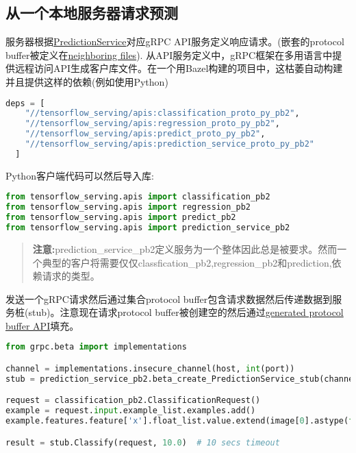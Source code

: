 \subsection{从一个本地服务器请求预测}
服务器根据\href{https://github.com/tensorflow/serving/blob/master/tensorflow_serving/apis/prediction_service.proto#L15}{PredictionService}对应gRPC API服务定义响应请求。(嵌套的protocol buffer被定义在\href{https://github.com/tensorflow/serving/blob/master/tensorflow_serving/apis}{neighboring files}).
从API服务定义中，gRPC框架在多用语言中提供远程访问API生成客户库文件。在一个用Bazel构建的项目中，这枯萎自动构建并且提供这样的依赖(例如使用Python)
\begin{lstlisting}[language=Python]
 deps = [
    "//tensorflow_serving/apis:classification_proto_py_pb2",
    "//tensorflow_serving/apis:regression_proto_py_pb2",
    "//tensorflow_serving/apis:predict_proto_py_pb2",
    "//tensorflow_serving/apis:prediction_service_proto_py_pb2"
  ]
\end{lstlisting}
Python客户端代码可以然后导入库:
\begin{lstlisting}[language=Python]
from tensorflow_serving.apis import classification_pb2
from tensorflow_serving.apis import regression_pb2
from tensorflow_serving.apis import predict_pb2
from tensorflow_serving.apis import prediction_service_pb2
\end{lstlisting}
\begin{quote}
\textbf{注意:}prediction\_service\_pb2定义服务为一个整体因此总是被要求。然而一个典型的客户将需要仅仅classfication\_pb2,regression\_pb2和prediction,依赖请求的类型。
\end{quote}
发送一个gRPC请求然后通过集合protocol buffer包含请求数据然后传递数据到服务桩(stub)。注意现在请求protocol buffer被创建空的然后通过\href{https://developers.google.com/protocol-buffers/docs/reference/python-generated?hl=zh-cn}{generated protocol buffer API}填充。
\begin{lstlisting}[language=Python]
from grpc.beta import implementations

channel = implementations.insecure_channel(host, int(port))
stub = prediction_service_pb2.beta_create_PredictionService_stub(channel)

request = classification_pb2.ClassificationRequest()
example = request.input.example_list.examples.add()
example.features.feature['x'].float_list.value.extend(image[0].astype(float))

result = stub.Classify(request, 10.0)  # 10 secs timeout
\end{lstlisting}
